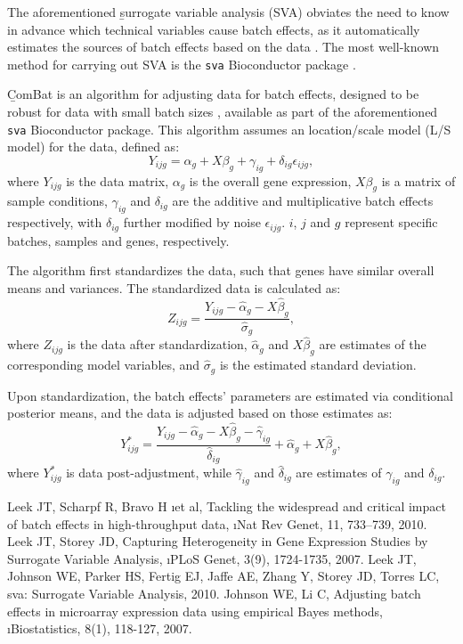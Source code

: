 \documentclass[12pt]{article}
\begin{document}
The aforementioned \b{surrogate variable analysis} (SVA) obviates the need to
know in advance which technical variables cause batch effects, as it
automatically estimates the sources of batch effects based on the data 
\cite{leek07}. The most well-known method for carrying out SVA is the
\texttt{sva} Bioconductor package \cite{sva}.
\n

\b{ComBat} is an algorithm for adjusting data for batch effects, designed to be
robust for data with small batch sizes \cite{johnson07}, available as part of
the aforementioned \texttt{sva} Bioconductor package. This algorithm assumes
an location/scale model (L/S model) for the data, defined as:
\[ 
	Y_{ijg} = 
	\alpha_{g} + 
	X\beta_{g} + 
	\gamma_{ig} + 
	\delta_{ig}\epsilon_{ijg},
\]
where $Y_{ijg}$ is the data matrix, $\alpha_{g}$ is the overall gene expression,
$X\beta_{g}$ is a matrix of sample conditions, $\gamma_{ig}$ and $\delta_{ig}$
are the additive and multiplicative batch effects respectively, with 
$\delta_{ig}$ further modified by noise $\epsilon_{ijg}$. $i$, $j$ and $g$
represent specific batches, samples and genes, respectively.
\n

The algorithm first standardizes the data, such that genes have similar overall 
means and variances. The standardized data is calculated as:
\[
	Z_{ijg} = 
	\frac
		{
			Y_{ijg} - 
			\hat{\alpha}_{g} - 
			X\hat{\beta}_{g}
		}
		{
			\hat{\sigma}_{g}
		},
\]
where $Z_{ijg}$ is the data after standardization, $\hat{\alpha}_{g}$ and
$X\hat{\beta}_{g}$ are estimates of the corresponding model variables, and
$\hat{\sigma}_{g}$ is the estimated standard deviation.
\n

Upon standardization, the batch effects' parameters are estimated via conditional
posterior means, and the data is adjusted based on those estimates as:
\[ 
	Y^{*}_{ijg} =
	\frac
		{
			Y_{ijg} - 
			\hat{\alpha}_{g} - 
			X\hat{\beta}_{g} - 
			\hat{\gamma}_{ig}
		}
		{
			\hat{\delta}_{ig}
		} + 
	\hat{\alpha}_{g} + 
	X\hat{\beta}_{g},
\]
where $Y^{*}_{ijg}$ is data post-adjustment, while $\hat{\gamma}_{ig}$ and
$\hat{\delta}_{ig}$ are estimates of $\gamma_{ig}$ and $\delta_{ig}$.
\\[20mm]


\begin{thebibliography}{9}

	Leek JT, Scharpf R, Bravo H \i{et al},
	Tackling the widespread and critical impact of batch effects in high-throughput data,
	\i{Nat Rev Genet}, 11, 733–739, 2010.
	Leek JT, Storey JD,
	Capturing Heterogeneity in Gene Expression Studies by Surrogate Variable Analysis,
	\i{PLoS Genet}, 3(9), 1724-1735, 2007.
	Leek JT, Johnson WE, Parker HS, Fertig EJ, Jaffe AE, Zhang Y, Storey JD, Torres LC,
	sva: Surrogate Variable Analysis,
	2010.
	Johnson WE, Li C,
	Adjusting batch effects in microarray expression data using empirical Bayes methods,
	\i{Biostatistics}, 8(1), 118-127, 2007.

\end{thebibliography}
\end{document}

